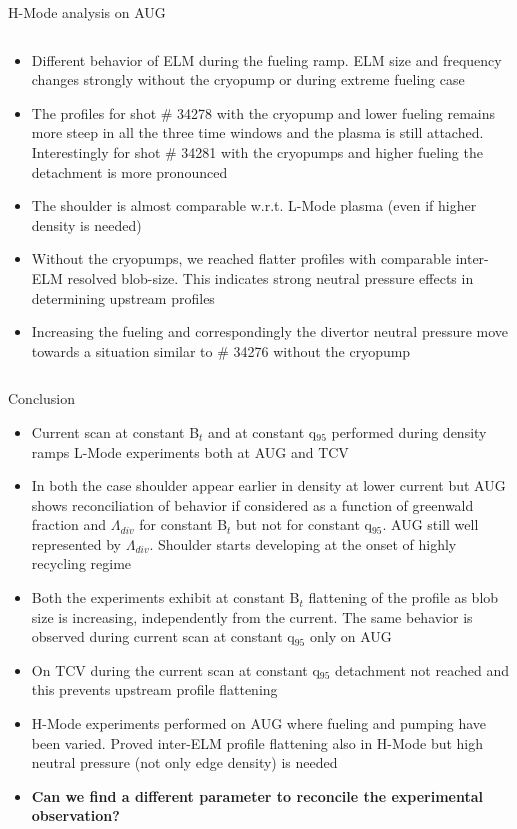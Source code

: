 \documentclass[10pt, compress]{beamer}
\newcommand\Fontvi{\fontsize{9}{8.2}\selectfont}
\begin{document}
\begin{frame}{H-Mode analysis on AUG}
\begin{columns}
\begin{column}{0.45\textwidth}
\begin{itemize}
    \item<2|only@2> Different behavior of ELM during the fueling
      ramp. ELM size and frequency changes strongly without the
      cryopump or during extreme fueling case
    \item<3|only@3> The profiles for shot \# 34278 with the cryopump
      and lower fueling remains more steep in all the three time
      windows and the plasma is still attached. Interestingly for shot \#
      34281 with the cryopumps and higher fueling the detachment is
      more pronounced
    \item<4|only@4> The shoulder is almost comparable 
      w.r.t. L-Mode plasma (even if higher density is needed)
    \item<5|only@5> Without the cryopumps, we reached flatter
         profiles with comparable inter-ELM resolved blob-size. This
         indicates strong neutral pressure effects in determining
         upstream profiles
    \item<6|only@6> Increasing the fueling and correspondingly the
      divertor neutral pressure move towards a situation similar to
      \# 34276 without the cryopump
      \end{itemize}
  \end{column}
\end{columns}
\end{frame}

\begin{frame}{Conclusion}
  \Fontvi
  \begin{itemize}
    \item Current scan at constant B$_t$ and at constant q$_{95}$
      performed during density ramps L-Mode experiments both at AUG
      and TCV
    \item In both the case shoulder appear earlier in density at lower
      current but AUG shows reconciliation of behavior if considered
      as a function of greenwald fraction and $\Lambda_{div}$ for
      constant B$_t$ but not for constant q$_{95}$. AUG still well
      represented by $\Lambda_{div}$. \alert{Shoulder starts
        developing at the onset of highly recycling regime}
    \item Both the experiments exhibit at constant B$_t$ flattening of the profile as
      blob size is increasing, independently from the current. The
      same behavior is observed during current scan at constant
      q$_{95}$ \alert{only on AUG}
    \item On TCV during the current scan at constant q$_{95}$
      detachment not reached and this \alert{prevents upstream profile
        flattening}
    \item H-Mode experiments performed on AUG where fueling and
      pumping have been varied. \alert{Proved inter-ELM profile flattening
      also in H-Mode} \alert{but high neutral pressure (not only edge
      density) is needed}
  \item<2-> \textbf{\textcolor{ta3scarletred}{Can we find a different parameter to reconcile
        the experimental observation?}}
  \end{itemize}
\end{frame}
\end{document}
